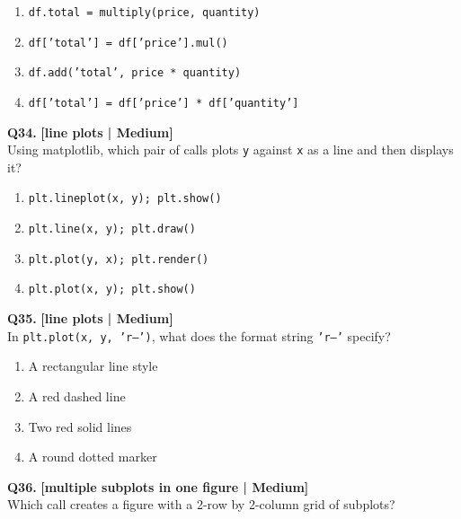\begin{enumerate}[label=(\alph*),topsep=2pt,itemsep=1pt,partopsep=0pt,parsep=0pt]
    \item \relax \texttt{df.total = multiply(price, quantity)}
    \item \relax \texttt{df['total'] = df['price'].mul()}
    \item \relax \texttt{df.add('total', price * quantity)}
    \item \relax \texttt{df['total'] = df['price'] * df['quantity']}
\end{enumerate}
\vspace{2mm}

\noindent\textbf{Q34.} \hfill {\small\color{LPUOrange}\textbf{[line plots | Medium]}}\\[2pt]
Using matplotlib, which pair of calls plots \texttt{y} against \texttt{x} as a line and then displays it?

\begin{enumerate}[label=(\alph*),topsep=2pt,itemsep=1pt,partopsep=0pt,parsep=0pt]
    \item \relax \texttt{plt.lineplot(x, y); plt.show()}
    \item \relax \texttt{plt.line(x, y); plt.draw()}
    \item \relax \texttt{plt.plot(y, x); plt.render()}
    \item \relax \texttt{plt.plot(x, y); plt.show()}
\end{enumerate}
\vspace{2mm}

\noindent\textbf{Q35.} \hfill {\small\color{LPUOrange}\textbf{[line plots | Medium]}}\\[2pt]
In \texttt{plt.plot(x, y, 'r--')}, what does the format string \texttt{'r--'} specify?

\begin{enumerate}[label=(\alph*),topsep=2pt,itemsep=1pt,partopsep=0pt,parsep=0pt]
    \item \relax A rectangular line style
    \item \relax A red dashed line
    \item \relax Two red solid lines
    \item \relax A round dotted marker
\end{enumerate}
\vspace{2mm}

\noindent\textbf{Q36.} \hfill {\small\color{LPUOrange}\textbf{[multiple subplots in one figure | Medium]}}\\[2pt]
Which call creates a figure with a 2-row by 2-column grid of subplots?

